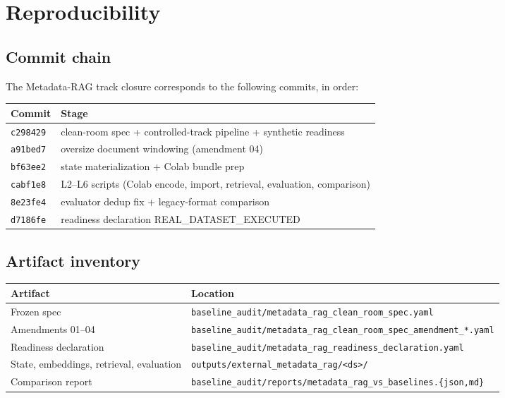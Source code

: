 \documentclass[11pt,a4paper]{article}
\begin{document}
\section{Reproducibility}\label{sec:repro}

\subsection{Commit chain}
The Metadata-RAG track closure corresponds to the following commits,
in order:

\begin{center}
\small
\begin{tabular}{l l}
\toprule
\textbf{Commit} & \textbf{Stage} \\
\midrule
\texttt{c298429} & clean-room spec + controlled-track pipeline + synthetic readiness \\
\texttt{a91bed7} & oversize document windowing (amendment 04) \\
\texttt{bf63ee2} & state materialization + Colab bundle prep \\
\texttt{cabf1e8} & L2--L6 scripts (Colab encode, import, retrieval, evaluation, comparison) \\
\texttt{8e23fe4} & evaluator dedup fix + legacy-format comparison \\
\texttt{d7186fe} & readiness declaration REAL\_DATASET\_EXECUTED \\
\bottomrule
\end{tabular}
\end{center}

\subsection{Artifact inventory}
\begin{center}
\small
\begin{tabular}{l l}
\toprule
\textbf{Artifact} & \textbf{Location} \\
\midrule
Frozen spec & \texttt{baseline\_audit/metadata\_rag\_clean\_room\_spec.yaml} \\
Amendments 01--04 & \texttt{baseline\_audit/metadata\_rag\_clean\_room\_spec\_amendment\_*.yaml} \\
Readiness declaration & \texttt{baseline\_audit/metadata\_rag\_readiness\_declaration.yaml} \\
State, embeddings, retrieval, evaluation & \texttt{outputs/external\_metadata\_rag/<ds>/} \\
Comparison report & \texttt{baseline\_audit/reports/metadata\_rag\_vs\_baselines.\{json,md\}} \\
\bottomrule
\end{tabular}
\end{center}
\end{document}

